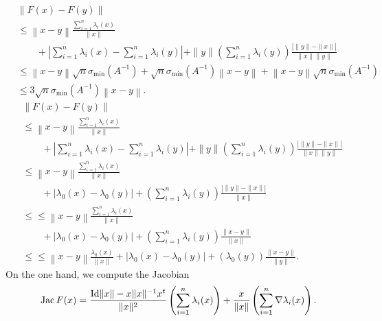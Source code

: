 \documentclass[a4paper]{article}
\begin{document}
    \begin{align}
        &
        \left\| F(x) - F(y) \right\|
        \\&
        \leq
        \left\| x - y \right\|
        \frac{\sum_{i=1}^{n} \lambda_{i}(x)}{\|x\|}
        \\&\qquad 
        +
        \left| \sum_{i=1}^{n} \lambda_{i}(x) - \sum_{i=1}^{n} \lambda_{i}(y) \right|
        +
        \|y\| \left( \sum_{i=1}^{n} \lambda_{i}(y) \right)
        \frac{ \left| \|y\| - \|x\| \right| }{\|x\| \|y\|}
        \\&\leq
        \left\| x - y \right\|
        \sqrt{n} \sigma_{\min}(A^{-1})
        +
        \sqrt{n} \sigma_{\min}(A^{-1}) \left\| x - y \right\|
        +
        \left\| x - y \right\|
        \sqrt{n} \sigma_{\min}(A^{-1})
        \\&\leq
        3\sqrt{n} \sigma_{\min}(A^{-1})
        \left\| x - y \right\|
        .    
    \end{align}
    \begin{align}
        &
        \left\| F(x) - F(y) \right\|
        \\&
        \leq
        \left\| x - y \right\|
        \frac{\sum_{i=1}^{n} \lambda_{i}(x)}{\|x\|}
        \\&\qquad 
        +
        \left| \sum_{i=1}^{n} \lambda_{i}(x) - \sum_{i=1}^{n} \lambda_{i}(y) \right|
        +
        \|y\| \left( \sum_{i=1}^{n} \lambda_{i}(y) \right)
        \frac{ \left| \|y\| - \|x\| \right| }{\|x\| \|y\|}
        \\&
        \leq
        \left\| x - y \right\|
        \frac{\sum_{i=1}^{n} \lambda_{i}(x)}{\|x\|}
        \\&\qquad 
        +
        \left| \lambda_{0}(x) - \lambda_{0}(y) \right|
        +
        \left( \sum_{i=1}^{n} \lambda_{i}(y) \right)
        \frac{ \left| \|y\| - \|x\| \right| }{\|x\|}
        \\&\leq
        \leq
        \left\| x - y \right\|
        \frac{\sum_{i=1}^{n} \lambda_{i}(x)}{\|x\|}
        \\&\qquad 
        +
        \left| \lambda_{0}(x) - \lambda_{0}(y) \right|
        +
        \left( \sum_{i=1}^{n} \lambda_{i}(y) \right)
        \frac{ \| x - y \| }{\|x\|}
        \\&\leq
        \leq
        \left\| x - y \right\|
        \frac{ \lambda_{0}(x) }{\|x\|}
        +
        \left| \lambda_{0}(x) - \lambda_{0}(y) \right|
        +
        \left( \lambda_{0}(y) \right)
        \frac{ \| x - y \| }{\|y\|}
        .    
    \end{align}
    On the one hand,
    we compute the Jacobian  
    \begin{align}
        \operatorname{{\rm Jac}} F(x) 
        = 
        \frac{ {\rm Id} \|x\| - x \|x\|^{-1} x^t }{\|x\|^2} 
        \left( \sum_{i=1}^{n} \lambda_{i}(x) \right)
        + 
        \frac{x}{\|x\|} \left( \sum_{i=1}^{n} \nabla\lambda_{i}(x) \right)
        .
    \end{align}
    
\end{document}
